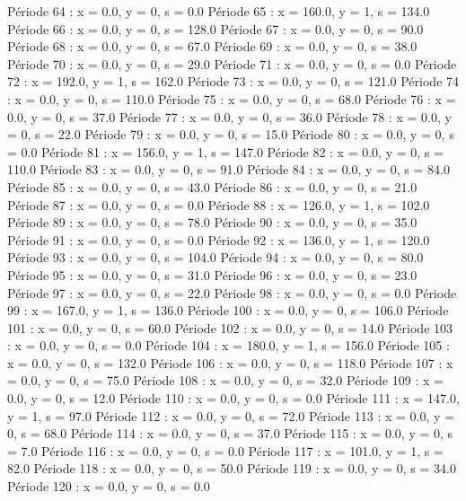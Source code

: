 Période 64 : x = 0.0, y = 0, s = 0.0
Période 65 : x = 160.0, y = 1, s = 134.0
Période 66 : x = 0.0, y = 0, s = 128.0
Période 67 : x = 0.0, y = 0, s = 90.0
Période 68 : x = 0.0, y = 0, s = 67.0
Période 69 : x = 0.0, y = 0, s = 38.0
Période 70 : x = 0.0, y = 0, s = 29.0
Période 71 : x = 0.0, y = 0, s = 0.0
Période 72 : x = 192.0, y = 1, s = 162.0
Période 73 : x = 0.0, y = 0, s = 121.0
Période 74 : x = 0.0, y = 0, s = 110.0
Période 75 : x = 0.0, y = 0, s = 68.0
Période 76 : x = 0.0, y = 0, s = 37.0
Période 77 : x = 0.0, y = 0, s = 36.0
Période 78 : x = 0.0, y = 0, s = 22.0
Période 79 : x = 0.0, y = 0, s = 15.0
Période 80 : x = 0.0, y = 0, s = 0.0
Période 81 : x = 156.0, y = 1, s = 147.0
Période 82 : x = 0.0, y = 0, s = 110.0
Période 83 : x = 0.0, y = 0, s = 91.0
Période 84 : x = 0.0, y = 0, s = 84.0
Période 85 : x = 0.0, y = 0, s = 43.0
Période 86 : x = 0.0, y = 0, s = 21.0
Période 87 : x = 0.0, y = 0, s = 0.0
Période 88 : x = 126.0, y = 1, s = 102.0
Période 89 : x = 0.0, y = 0, s = 78.0
Période 90 : x = 0.0, y = 0, s = 35.0
Période 91 : x = 0.0, y = 0, s = 0.0
Période 92 : x = 136.0, y = 1, s = 120.0
Période 93 : x = 0.0, y = 0, s = 104.0
Période 94 : x = 0.0, y = 0, s = 80.0
Période 95 : x = 0.0, y = 0, s = 31.0
Période 96 : x = 0.0, y = 0, s = 23.0
Période 97 : x = 0.0, y = 0, s = 22.0
Période 98 : x = 0.0, y = 0, s = 0.0
Période 99 : x = 167.0, y = 1, s = 136.0
Période 100 : x = 0.0, y = 0, s = 106.0
Période 101 : x = 0.0, y = 0, s = 60.0
Période 102 : x = 0.0, y = 0, s = 14.0
Période 103 : x = 0.0, y = 0, s = 0.0
Période 104 : x = 180.0, y = 1, s = 156.0
Période 105 : x = 0.0, y = 0, s = 132.0
Période 106 : x = 0.0, y = 0, s = 118.0
Période 107 : x = 0.0, y = 0, s = 75.0
Période 108 : x = 0.0, y = 0, s = 32.0
Période 109 : x = 0.0, y = 0, s = 12.0
Période 110 : x = 0.0, y = 0, s = 0.0
Période 111 : x = 147.0, y = 1, s = 97.0
Période 112 : x = 0.0, y = 0, s = 72.0
Période 113 : x = 0.0, y = 0, s = 68.0
Période 114 : x = 0.0, y = 0, s = 37.0
Période 115 : x = 0.0, y = 0, s = 7.0
Période 116 : x = 0.0, y = 0, s = 0.0
Période 117 : x = 101.0, y = 1, s = 82.0
Période 118 : x = 0.0, y = 0, s = 50.0
Période 119 : x = 0.0, y = 0, s = 34.0
Période 120 : x = 0.0, y = 0, s = 0.0



